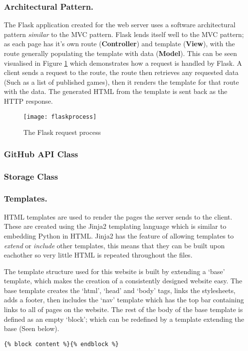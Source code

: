 	\subsubsection{Architectural Pattern.}
	The Flask application created for the web server uses a software architectural pattern \emph{similar} to the MVC pattern. Flask lends itself well to the MVC pattern; as each page has it's own route (\textbf{Controller}) and template (\textbf{View}), with the route generally populating the template with data (\textbf{Model}). This can be seen visualised in Figure \ref{fig:flaskprocess} which demonstrates how a request is handled by Flask. A client sends a request to the route, the route then retrieves any requested data (Such as a list of published games), then it renders the template for that route with the data. The generated HTML from the template is sent back as the HTTP response.

	\begin{figure}[h]
		\centering
		\texttt{[image: flaskprocess]}
		\caption{The Flask request process}
		\label{fig:flaskprocess}
	\end{figure}

	\subsubsection{GitHub API Class}
	\subsubsection{Storage Class}

	\subsubsection{Templates.}
	HTML templates are used to render the pages the server sends to the client. These are created using the Jinja2 templating language which is similar to embedding Python in HTML. Jinja2 has the feature of allowing templates to \emph{extend} or \emph{include} other templates, this means that they can be built upon eachother so very little HTML is repeated throughout the files. 

	The template structure used for this website is built by extending a `base' template, which makes the creation of a consistently designed website easy. The base template creates the `html', `head' and `body' tags, links the stylesheets, adds a footer, then includes the `nav' template which has the top bar containing links to all of pages on the website. The rest of the body of the base template is defined as an empty `block'; which can be redefined by a template extending the base (Seen below).
	\lstset{language=HTML,frame=single}
	\begin{lstlisting}
{% block content %}{% endblock %}
	\end{lstlisting}

